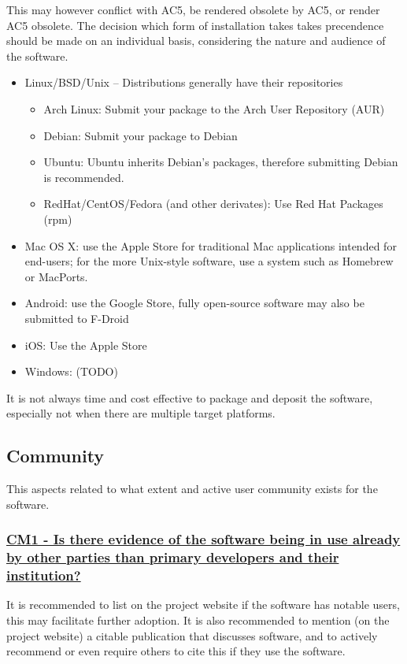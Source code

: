 \documentclass[a4paper,11pt]{article}
\newcommand{\criterion}[1]{\subsubsection*{\underline{#1}}}
\begin{document}
This may however conflict with AC5, be rendered obsolete by AC5, or render AC5
obsolete. The decision which form of installation takes takes precendence should be
made on an individual basis, considering the nature and audience of the
software.

\begin{itemize}
    \item Linux/BSD/Unix -- Distributions generally have their repositories
    \begin{itemize}
        \item Arch Linux: Submit your package to the Arch User Repository (AUR)
        \item Debian: Submit your package to Debian
        \item Ubuntu: Ubuntu inherits Debian's packages, therefore submitting Debian is recommended.
        \item RedHat/CentOS/Fedora (and other derivates): Use Red Hat Packages (rpm)
    \end{itemize}
    \item Mac OS X: use the Apple Store for traditional Mac applications intended for end-users; for the more Unix-style
        software, use a system such as Homebrew or MacPorts.
    \item Android: use the Google Store, fully open-source software may also be
        submitted to F-Droid
    \item iOS: Use the Apple Store
    \item Windows: (TODO) 
\end{itemize}

It is not always time and cost effective to package and deposit the software, especially not
when there are multiple target platforms. 

\subsection{Community}

This aspects related to what extent and active user community exists for the
software.

\criterion{CM1 - Is there evidence of the software being in use already by
other parties than primary developers and their institution?}

It is recommended to list on the project website if the software has notable
users, this may facilitate further adoption. It is also recommended to mention
(on the project website) a citable publication that discusses software, and to
actively recommend or even require others to cite this if they use the
software.
\end{document}
